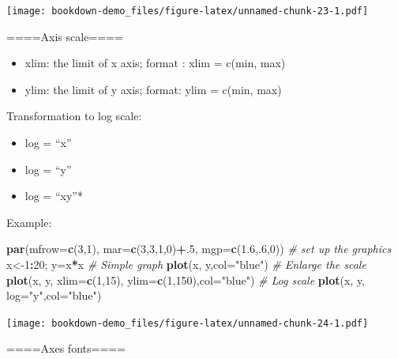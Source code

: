 \documentclass[]{book}
\newenvironment{Shaded}{\begin{snugshade}}{\end{snugshade}}
\newcommand{\KeywordTok}[1]{\textcolor[rgb]{0.13,0.29,0.53}{\textbf{#1}}}
\newcommand{\DataTypeTok}[1]{\textcolor[rgb]{0.13,0.29,0.53}{#1}}
\newcommand{\DecValTok}[1]{\textcolor[rgb]{0.00,0.00,0.81}{#1}}
\newcommand{\FloatTok}[1]{\textcolor[rgb]{0.00,0.00,0.81}{#1}}
\newcommand{\StringTok}[1]{\textcolor[rgb]{0.31,0.60,0.02}{#1}}
\newcommand{\CommentTok}[1]{\textcolor[rgb]{0.56,0.35,0.01}{\textit{#1}}}
\newcommand{\OperatorTok}[1]{\textcolor[rgb]{0.81,0.36,0.00}{\textbf{#1}}}
\newcommand{\NormalTok}[1]{#1}
\begin{document}
\texttt{[image: bookdown-demo\_files/figure-latex/unnamed-chunk-23-1.pdf]}

====Axis scale====

\begin{itemize}
\item
  xlim: the limit of x axis; format : xlim = c(min, max)
\item
  ylim: the limit of y axis; format: ylim = c(min, max)
\end{itemize}

Transformation to log scale:

\begin{itemize}
\item
  log = ``x''
\item
  log = ``y''
\item
  log = ``xy''*
\end{itemize}

Example:

\begin{Shaded}
\begin{Highlighting}[]
\KeywordTok{par}\NormalTok{(}\DataTypeTok{mfrow=}\KeywordTok{c}\NormalTok{(}\DecValTok{3}\NormalTok{,}\DecValTok{1}\NormalTok{), }\DataTypeTok{mar=}\KeywordTok{c}\NormalTok{(}\DecValTok{3}\NormalTok{,}\DecValTok{3}\NormalTok{,}\DecValTok{1}\NormalTok{,}\DecValTok{0}\NormalTok{)}\OperatorTok{+}\NormalTok{.}\DecValTok{5}\NormalTok{, }\DataTypeTok{mgp=}\KeywordTok{c}\NormalTok{(}\FloatTok{1.6}\NormalTok{,.}\DecValTok{6}\NormalTok{,}\DecValTok{0}\NormalTok{))  }\CommentTok{# set up the graphics}
\NormalTok{x<-}\DecValTok{1}\OperatorTok{:}\DecValTok{20}\NormalTok{; y=x}\OperatorTok{*}\NormalTok{x}
\CommentTok{# Simple graph}
\KeywordTok{plot}\NormalTok{(x, y,}\DataTypeTok{col=}\StringTok{"blue"}\NormalTok{)}
\CommentTok{# Enlarge the scale}
\KeywordTok{plot}\NormalTok{(x, y, }\DataTypeTok{xlim=}\KeywordTok{c}\NormalTok{(}\DecValTok{1}\NormalTok{,}\DecValTok{15}\NormalTok{), }\DataTypeTok{ylim=}\KeywordTok{c}\NormalTok{(}\DecValTok{1}\NormalTok{,}\DecValTok{150}\NormalTok{),}\DataTypeTok{col=}\StringTok{"blue"}\NormalTok{)}
\CommentTok{# Log scale}
\KeywordTok{plot}\NormalTok{(x, y, }\DataTypeTok{log=}\StringTok{"y"}\NormalTok{,}\DataTypeTok{col=}\StringTok{"blue"}\NormalTok{)}
\end{Highlighting}
\end{Shaded}

\texttt{[image: bookdown-demo\_files/figure-latex/unnamed-chunk-24-1.pdf]}

====Axes fonts====
\end{document}
